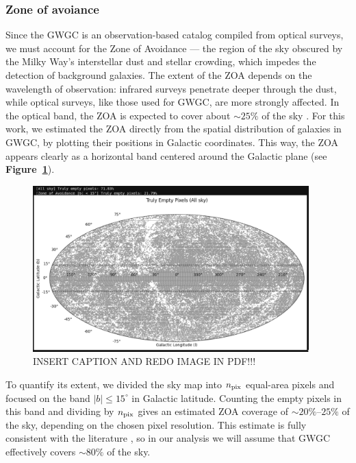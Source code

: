 \subsubsection{Zone of avoiance}

Since the GWGC is an observation-based catalog compiled from optical surveys, we must account for the Zone of Avoidance — the region of the sky obscured by the Milky Way’s interstellar dust and stellar crowding, which impedes the detection of background galaxies.
The extent of the ZOA depends on the wavelength of observation: infrared surveys penetrate deeper through the dust, while optical surveys, like those used for GWGC, are more strongly affected. 
In the optical band, the ZOA is expected to cover about $\sim25\%$ of the sky \cite{Kraan-Korteweg}.
For this work, we estimated the ZOA directly from the spatial distribution of galaxies in GWGC, by plotting their positions in Galactic coordinates. 
This way, the ZOA appears clearly as a horizontal band centered around the Galactic plane (see \textbf{Figure~\ref{fig: ZOA in galactic coordinates}}).
\begin{figure}
    \begin{center}
        \includegraphics[width=0.95\textwidth]{images/ZOA_galactic_coords.png}
    \end{center}
    \caption{INSERT CAPTION AND REDO IMAGE IN PDF!!!}\label{fig: ZOA in galactic coordinates}
\end{figure}
To quantify its extent, we divided the sky map into $n_{\rm pix}$ equal-area pixels and focused on the band $|b| \leq 15^\circ$ in Galactic latitude.
Counting the empty pixels in this band and dividing by $n_{\rm pix}$ gives an estimated ZOA coverage of $\sim20\%$–$25\%$ of the sky, depending on the chosen pixel resolution.
This estimate is fully consistent with the literature \cite{Kraan-Korteweg}, so in our analysis we will assume that GWGC effectively covers $\sim80\%$ of the sky.

